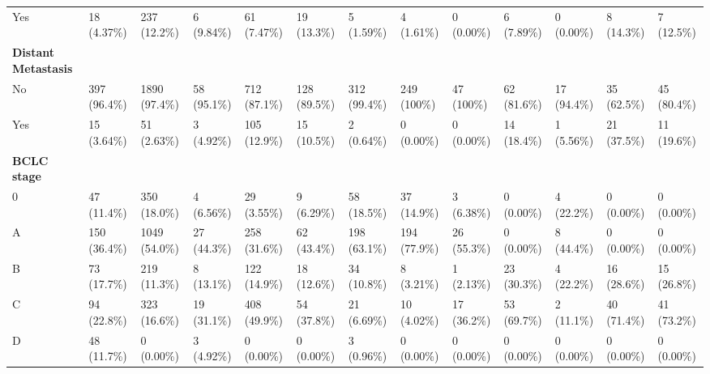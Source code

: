 \documentclass{article}
\begin{document}
\begin{landscape}
\begin{tiny}
\begin{tabularx}{\linewidth}{p{4.5cm}|X|X|X|X|X|X|X|X|X|X|X|X}
\rowcolor{gray!10}
    Yes &    18 (4.37\%)    &   237 (12.2\%)    &    6 (9.84\%)     &    61 (7.47\%)    &    19 (13.3\%)    &    5 (1.59\%)     &    4 (1.61\%)     &    0 (0.00\%)     &    6 (7.89\%)     &    0 (0.00\%)     &    8 (14.3\%)     &    7 (12.5\%)     \\
\rowcolor{gray!30}
\textbf{Distant Metastasis }  &  &  &  &  &  &  &  &  &  &  &  &  \\
\rowcolor{gray!10}
    No &   397 (96.4\%)    &   1890 (97.4\%)   &    58 (95.1\%)    &   712 (87.1\%)    &   128 (89.5\%)    &   312 (99.4\%)    &    249 (100\%)    &    47 (100\%)     &    62 (81.6\%)    &    17 (94.4\%)    &    35 (62.5\%)    &    45 (80.4\%)    \\
\rowcolor{gray!10}
    Yes &    15 (3.64\%)    &    51 (2.63\%)    &    3 (4.92\%)     &   105 (12.9\%)    &    15 (10.5\%)    &    2 (0.64\%)     &    0 (0.00\%)     &    0 (0.00\%)     &    14 (18.4\%)    &    1 (5.56\%)     &    21 (37.5\%)    &    11 (19.6\%)    \\
\rowcolor{gray!30}
\textbf{BCLC stage }  &  &  &  &  &  &  &  &  &  &  &  &  \\
\rowcolor{gray!10}
    0 &    47 (11.4\%)    &   350 (18.0\%)    &    4 (6.56\%)     &    29 (3.55\%)    &    9 (6.29\%)     &    58 (18.5\%)    &    37 (14.9\%)    &    3 (6.38\%)     &    0 (0.00\%)     &    4 (22.2\%)     &    0 (0.00\%)     &    0 (0.00\%)     \\
\rowcolor{gray!10}
    A &   150 (36.4\%)    &   1049 (54.0\%)   &    27 (44.3\%)    &   258 (31.6\%)    &    62 (43.4\%)    &   198 (63.1\%)    &   194 (77.9\%)    &    26 (55.3\%)    &    0 (0.00\%)     &    8 (44.4\%)     &    0 (0.00\%)     &    0 (0.00\%)     \\
\rowcolor{gray!10}
    B &    73 (17.7\%)    &   219 (11.3\%)    &    8 (13.1\%)     &   122 (14.9\%)    &    18 (12.6\%)    &    34 (10.8\%)    &    8 (3.21\%)     &    1 (2.13\%)     &    23 (30.3\%)    &    4 (22.2\%)     &    16 (28.6\%)    &    15 (26.8\%)    \\
\rowcolor{gray!10}
    C &    94 (22.8\%)    &   323 (16.6\%)    &    19 (31.1\%)    &   408 (49.9\%)    &    54 (37.8\%)    &    21 (6.69\%)    &    10 (4.02\%)    &    17 (36.2\%)    &    53 (69.7\%)    &    2 (11.1\%)     &    40 (71.4\%)    &    41 (73.2\%)    \\
\rowcolor{gray!10}
    D &    48 (11.7\%)    &    0 (0.00\%)     &    3 (4.92\%)     &    0 (0.00\%)     &    0 (0.00\%)     &    3 (0.96\%)     &    0 (0.00\%)     &    0 (0.00\%)     &    0 (0.00\%)     &    0 (0.00\%)     &    0 (0.00\%)     &    0 (0.00\%)     \\

\end{tabularx}
\end{tiny}
\end{landscape}
\end{document}
